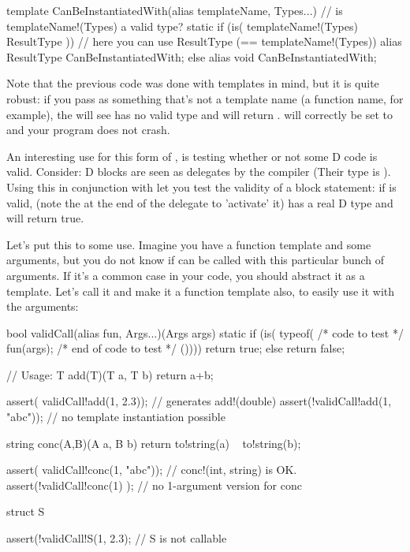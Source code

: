 \begin{dcode}
template CanBeInstantiatedWith(alias templateName, Types...)
{
    // is templateName!(Types) a valid type?
    static if (is( templateName!(Types) ResultType ))
    // here you can use ResultType (== templateName!(Types))
        alias ResultType CanBeInstantiatedWith;
    else
        alias void       CanBeInstantiatedWith;
}
\end{dcode}

Note that the previous code was done with templates in mind, but it is quite robust: if you pass as  something that's not a template name (a func\-tion name, for ex\-am\-ple), the  will see  has no valid type and will return .   will cor\-rec\-tly be set to  and your program does not crash.


An interesting use for this form of , is testing whether or not some D code is valid. Consider: D blocks are seen as delegates by the compiler (Their type is \DD{()}). Using this in conjunction with  let you test the validity of a block statement: if  is valid,  (note the \DD{()} at the end of the delegate to 'activate' it) has a real D type and  will return true.

Let's put this to some use. Imagine you have a function template  and some arguments, but you do not know if  can be called with this particular bunch of arguments. If it's a common case in your code, you should abstract it as a template. Let's call it  and make it a function template also, to easily use it with the arguments:

\begin{dcode}
bool validCall(alias fun, Args...)(Args args) 
{
    static if (is( typeof({ /* code to test */
                            fun(args);
                            /* end of code to test */
                          }())))
        return true;
    else
        return false;
}

// Usage:
T add(T)(T a, T b) { return a+b;}

assert( validCall!add(1, 2.3));   // generates add!(double)
assert(!validCall!add(1, "abc")); // no template instantiation possible

string conc(A,B)(A a, B b) { return to!string(a) ~ to!string(b);}

assert( validCall!conc(1, "abc")); // conc!(int, string) is OK.
assert(!validCall!conc(1)       ); // no 1-argument version for conc

struct S {}

assert(!validCall!S(1, 2.3); // S is not callable
\end{dcode}

